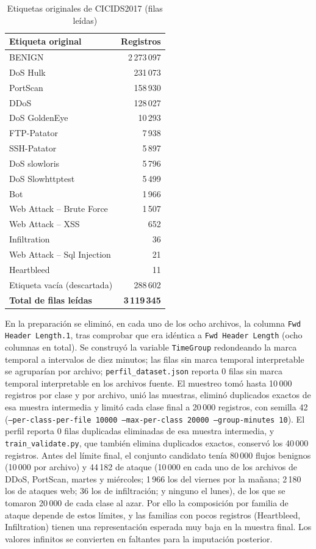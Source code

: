 \documentclass[conference]{IEEEtran}
\begin{document}
\begin{table}[!tb]
\centering
\footnotesize
\caption{Etiquetas originales de CICIDS2017 (filas leídas)}
\label{tab:cicids_etiquetas}
\begin{tabular}{lr}
\toprule
\textbf{Etiqueta original} & \textbf{Registros} \\
\midrule
BENIGN & 2\,273\,097 \\
DoS Hulk & 231\,073 \\
PortScan & 158\,930 \\
DDoS & 128\,027 \\
DoS GoldenEye & 10\,293 \\
FTP-Patator & 7\,938 \\
SSH-Patator & 5\,897 \\
DoS slowloris & 5\,796 \\
DoS Slowhttptest & 5\,499 \\
Bot & 1\,966 \\
Web Attack -- Brute Force & 1\,507 \\
Web Attack -- XSS & 652 \\
Infiltration & 36 \\
Web Attack -- Sql Injection & 21 \\
Heartbleed & 11 \\
\midrule
Etiqueta vacía (descartada) & 288\,602 \\
\textbf{Total de filas leídas} & \textbf{3\,119\,345} \\
\bottomrule
\end{tabular}
\end{table}

En la preparación se eliminó, en cada uno de los ocho archivos, la columna \texttt{Fwd Header Length.1}, tras comprobar que era idéntica a \texttt{Fwd Header Length} (ocho columnas en total). Se construyó la variable \texttt{TimeGroup} redondeando la marca temporal a intervalos de diez minutos; las filas sin marca temporal interpretable se agruparían por archivo; \texttt{perfil\_dataset.json} reporta 0 filas sin marca temporal interpretable en los archivos fuente. El muestreo tomó hasta 10\,000 registros por clase y por archivo, unió las muestras, eliminó duplicados exactos de esa muestra intermedia y limitó cada clase final a 20\,000 registros, con semilla 42 (\texttt{--per-class-per-file 10000 --max-per-class 20000 --group-minutes 10}). El perfil reporta 0 filas duplicadas eliminadas de esa muestra intermedia, y \texttt{train\_validate.py}, que también elimina duplicados exactos, conservó los 40\,000 registros. Antes del límite final, el conjunto candidato tenía 80\,000 flujos benignos (10\,000 por archivo) y 44\,182 de ataque (10\,000 en cada uno de los archivos de DDoS, PortScan, martes y miércoles; 1\,966 los del viernes por la mañana; 2\,180 los de ataques web; 36 los de infiltración; y ninguno el lunes), de los que se tomaron 20\,000 de cada clase al azar. Por ello la composición por familia de ataque depende de estos límites, y las familias con pocos registros (Heartbleed, Infiltration) tienen una representación esperada muy baja en la muestra final. Los valores infinitos se convierten en faltantes para la imputación posterior.
\end{document}
